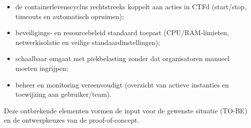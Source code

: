 \begin{itemize}
  \item de containerlevenscyclus rechtstreeks koppelt aan acties in CTFd (start/stop, timeouts en automatisch opruimen);
  \item beveiligings- en resourcebeleid standaard toepast (CPU/RAM-limieten, netwerkisolatie en veilige standaardinstellingen);
  \item schaalbaar omgaat met piekbelasting zonder dat organisatoren manueel moeten ingrijpen;
  \item beheer en monitoring vereenvoudigt (overzicht van actieve instanties en toewijzing aan gebruiker/team).
\end{itemize}

Deze ontbrekende elementen vormen de input voor de gewenste situatie (TO-BE) en de ontwerpkeuzes van de proof-of-concept.
